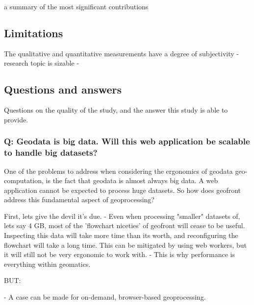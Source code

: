 a summary of the most significant contributions





\subsection{Limitations}
\label{sec:limitations}


The qualitative and quantitative measurements have a degree of subjectivity
- research topic is sizable
- 



\subsection*{Questions and answers}
Questions on the quality of the study, and the answer this study is able to provide.

\subsubsection*{Q: Geodata is big data. Will this web application be scalable to handle big datasets?}

One of the problems to address when considering the ergonomics of geodata geo-computation, is the fact that geodata is almost always big data. A web application cannot be expected to process huge datasets. So how does geofront address this fundamental aspect of geoprocessing? 

First, lets give the devil it's due. 
- Even when processing "smaller" datasets of, lets say 4 GB, most of the 'flowchart niceties' of geofront will cease to be useful. Inspecting this data will take more time than its worth, and reconfiguring the flowchart will take a long time. This can be mitigated by using web workers, but it will still not be very ergonomic to work with. 
- This is why performance is everything within geomatics.

BUT: 

- A case can be made for on-demand, browser-based geoprocessing. 

